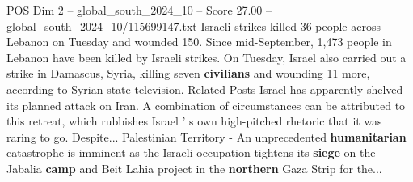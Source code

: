 \begin{textsample}{POS Dim 2 – global\_south\_2024\_10 – Score 27.00 – global\_south\_2024\_10/115699147.txt}
Israeli strikes killed 36 people across Lebanon on Tuesday and wounded 150.
Since mid-September, 1,473 people in Lebanon have been killed by Israeli strikes.
On Tuesday, Israel also carried out a strike in Damascus, Syria, killing seven \textbf{civilians} and wounding 11 more, according to Syrian state television.
Related Posts Israel has apparently shelved its planned attack on Iran.
A combination of circumstances can be attributed to this retreat, which rubbishes Israel ' s own high-pitched rhetoric that it was raring to go.
Despite...
Palestinian Territory - An unprecedented \textbf{humanitarian} catastrophe is imminent as the Israeli occupation tightens its \textbf{siege} on the Jabalia \textbf{camp} and Beit Lahia project in the \textbf{northern} Gaza Strip for the...

\end{textsample}
